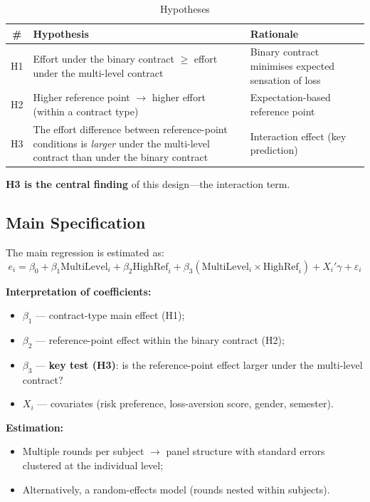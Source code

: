 \documentclass[
    11pt,
    a4paper,
    parskip=half,
    headings=normal
]{scrartcl}
\numberwithin{equation}{section}
\theoremstyle{definition}
\theoremstyle{remark}
\begin{document}
\begin{table}[h]
\centering
\renewcommand{\arraystretch}{1.3}
\begin{tabular}{@{}clp{4.5cm}@{}}
\toprule
\textbf{\#} & \textbf{Hypothesis} & \textbf{Rationale} \\
\midrule
H1 & Effort under the binary contract $\geq$ effort under the multi-level contract & Binary contract minimises expected sensation of loss \\
H2 & Higher reference point $\rightarrow$ higher effort (within a contract type) & Expectation-based reference point \\
H3 & The effort difference between reference-point conditions is \emph{larger} under the multi-level contract than under the binary contract & Interaction effect (key prediction) \\
\bottomrule
\end{tabular}
\caption{Hypotheses}
\label{tab:hypotheses}
\end{table}

\noindent\textbf{H3 is the central finding} of this design---the interaction term.

\subsection{Main Specification}
The main regression is estimated as:
\begin{equation}
e_{i} = \beta_0 + \beta_1 \text{MultiLevel}_i + \beta_2 \text{HighRef}_i
+ \beta_3 \left(\text{MultiLevel}_i \times \text{HighRef}_i\right) + X_i'\gamma + \varepsilon_i
\end{equation}

\noindent\textbf{Interpretation of coefficients:}
\begin{itemize}
    \item $\beta_1$ --- contract-type main effect (H1);
    \item $\beta_2$ --- reference-point effect within the binary contract (H2);
    \item $\beta_3$ --- \textbf{key test (H3)}: is the reference-point effect larger under the multi-level contract?
    \item $X_i$ --- covariates (risk preference, loss-aversion score, gender, semester).
\end{itemize}

\noindent\textbf{Estimation:}
\begin{itemize}
    \item Multiple rounds per subject $\rightarrow$ panel structure with standard errors clustered at the individual level;
    \item Alternatively, a random-effects model (rounds nested within subjects).
\end{itemize}
\end{document}
